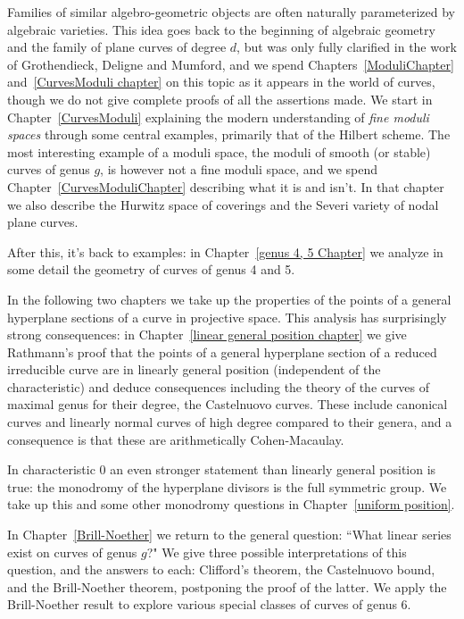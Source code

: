 Families of similar algebro-geometric objects are often naturally parameterized by algebraic varieties. This idea goes back to the beginning of algebraic geometry and the family of plane curves of degree $d$, but was only fully clarified in the work of Grothendieck, Deligne and Mumford, and we spend Chapters~\ref{ModuliChapter} and~\ref{CurvesModuli chapter} on this topic as it appears in the world of curves, though we do not give complete proofs of all the assertions made. We start in Chapter~\ref{CurvesModuli} explaining the modern understanding of \emph{fine moduli spaces} through some central examples, primarily that of
the Hilbert scheme. The most interesting example of a moduli space, the moduli of smooth (or stable) curves of genus $g$, is however not a fine moduli space, and we spend Chapter~\ref{CurvesModuliChapter} describing what it is and isn't. In that chapter we also describe the Hurwitz space of coverings and the Severi variety of nodal plane curves.

After this, it's back to examples: in Chapter~\ref{genus 4, 5 Chapter} we analyze in some detail the geometry of curves of genus 4 and 5.  


In the following two chapters we take up 
the properties of the points of a general hyperplane sections of a curve in projective space. This analysis has surprisingly strong consequences: in Chapter~\ref{linear general position chapter} we give Rathmann's proof that
the points of a general hyperplane section of a reduced irreducible curve are in linearly general position (independent of the characteristic)
and deduce consequences including the theory of the curves of maximal genus for their degree,
the Castelnuovo curves. These include
canonical curves and linearly normal curves of high degree compared to their genera, and
a consequence is that these are arithmetically Cohen-Macaulay.

In characteristic 0 an even stronger statement than linearly general position is true: the monodromy of the hyperplane divisors is the full symmetric group. We take up this
and some other monodromy questions in Chapter~\ref{uniform position}.

In Chapter~\ref{Brill-Noether} we return to the general question: ``What linear series exist on curves of genus $g$?" We give three possible interpretations of this question, and the answers to each: Clifford's theorem, the Castelnuovo bound, and the Brill-Noether theorem, postponing the proof of the latter. We apply the Brill-Noether result to explore  various special classes of curves of genus 6.

